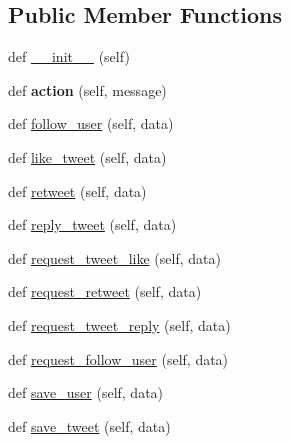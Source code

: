\subsection*{Public Member Functions}
\begin{DoxyCompactItemize}
\item 
def \hyperlink{classtwitter_1_1control__center_1_1dbwriter_1_1DBWriter_a084c7286de1162ebb245a955a65e3911}{\+\_\+\+\_\+init\+\_\+\+\_\+} (self)
\item 
\mbox{\label{classtwitter_1_1control__center_1_1dbwriter_1_1DBWriter_a87d9173e78b04aa21fac689879b5a3b3}} 
def {\bfseries action} (self, message)
\item 
def \hyperlink{classtwitter_1_1control__center_1_1dbwriter_1_1DBWriter_a59e9de0b9462c07bc173e160c3431e5a}{follow\+\_\+user} (self, data)
\item 
def \hyperlink{classtwitter_1_1control__center_1_1dbwriter_1_1DBWriter_a4539c991b82dd529602cbd13d21a89b4}{like\+\_\+tweet} (self, data)
\item 
def \hyperlink{classtwitter_1_1control__center_1_1dbwriter_1_1DBWriter_a840d1892b618a29a5e44305cb6aa0211}{retweet} (self, data)
\item 
def \hyperlink{classtwitter_1_1control__center_1_1dbwriter_1_1DBWriter_a1005772e640f1c4aae538a7850c2d15d}{reply\+\_\+tweet} (self, data)
\item 
def \hyperlink{classtwitter_1_1control__center_1_1dbwriter_1_1DBWriter_acb9c768e2862639056ef226e2eab77ec}{request\+\_\+tweet\+\_\+like} (self, data)
\item 
def \hyperlink{classtwitter_1_1control__center_1_1dbwriter_1_1DBWriter_af94a869d95d271c9fc1d23b9281c95a9}{request\+\_\+retweet} (self, data)
\item 
def \hyperlink{classtwitter_1_1control__center_1_1dbwriter_1_1DBWriter_a876d7b694fb3f54940e7f07afcbb0c09}{request\+\_\+tweet\+\_\+reply} (self, data)
\item 
def \hyperlink{classtwitter_1_1control__center_1_1dbwriter_1_1DBWriter_a957daaa2da31d56fc7dccb9a18f3346d}{request\+\_\+follow\+\_\+user} (self, data)
\item 
def \hyperlink{classtwitter_1_1control__center_1_1dbwriter_1_1DBWriter_a38708a33bd2b8019383571275b8a0f17}{save\+\_\+user} (self, data)
\item 
def \hyperlink{classtwitter_1_1control__center_1_1dbwriter_1_1DBWriter_a0596d9924189129c588b6c603f462d5b}{save\+\_\+tweet} (self, data)

\end{DoxyCompactItemize}

